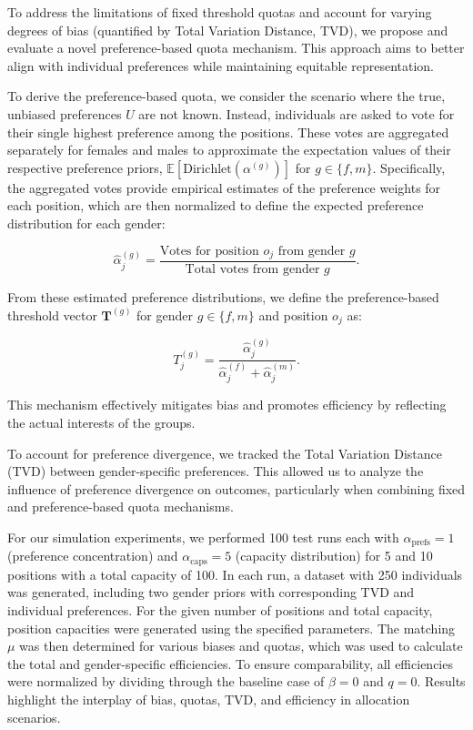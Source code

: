 \documentclass[letterpaper]{article}
\begin{document}
To address the limitations of fixed threshold quotas and account for varying degrees of bias (quantified by Total Variation Distance, TVD), we propose and evaluate a novel preference-based quota mechanism. This approach aims to better align with individual preferences while maintaining equitable representation.

To derive the preference-based quota, we consider the scenario where the true, unbiased preferences \( U \) are not known. Instead, individuals are asked to vote for their single highest preference among the positions. These votes are aggregated separately for females and males to approximate the expectation values of their respective preference priors, \( \mathbb{E}[\textrm{Dirichlet}(\alpha^{(g)})] \) for \( g \in \{f, m\} \). Specifically, the aggregated votes provide empirical estimates of the preference weights for each position, which are then normalized to define the expected preference distribution for each gender:

\[
\hat{\alpha}^{(g)}_j = \frac{\text{Votes for position } o_j \text{ from gender } g}{\text{Total votes from gender } g}.
\]

From these estimated preference distributions, we define the preference-based threshold vector \( \mathbf{T}^{(g)} \) for gender \( g \in \{f, m\} \) and position \( o_j \) as:

\[
T_j^{(g)} = \frac{\hat{\alpha}^{(g)}_j}{\hat{\alpha}^{(f)}_j + \hat{\alpha}^{(m)}_j}.
\]

This mechanism effectively mitigates bias and promotes efficiency by reflecting the actual interests of the groups.

To account for preference divergence, we tracked the Total Variation Distance (TVD) between gender-specific preferences. This allowed us to analyze the influence of preference divergence on outcomes, particularly when combining fixed and preference-based quota mechanisms.


For our simulation experiments, we performed 100 test runs each with \( \alpha_\text{prefs} = 1 \) (preference concentration) and \( \alpha_\text{caps} = 5 \) (capacity distribution) for 5 and 10 positions with a total capacity of 100. In each run, a dataset with 250 individuals was generated, including two gender priors with corresponding TVD and individual preferences. For the given number of positions and total capacity, position capacities were generated using the specified parameters. The matching \( \mu \) was then determined for various biases and quotas, which was used to calculate the total and gender-specific efficiencies. To ensure comparability, all efficiencies were normalized by dividing through the baseline case of \( \beta = 0 \) and \( q = 0 \). Results highlight the interplay of bias, quotas, TVD, and efficiency in allocation scenarios.
\end{document}
